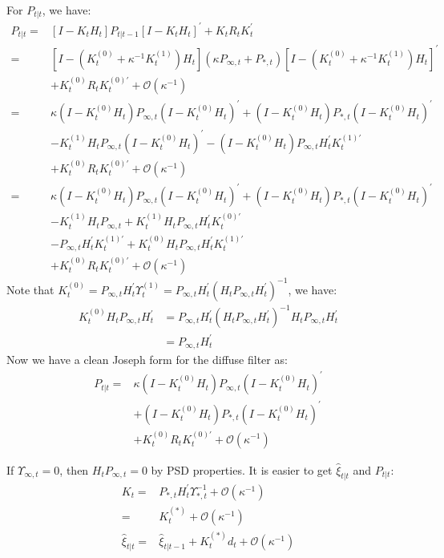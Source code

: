 \documentclass[10pt, titlepage]{article}
\numberwithin{equation}{section}
\begin{document}
For $P_{t|t}$, we have:
\begin{align*}
    P_{t|t} =& [I-K_tH_t]P_{t|t-1}[I-K_tH_t]^{'}+K_tR_tK_t^{'} \\
    =& [I-(K_t^{(0)}+\kappa^{-1}K_t^{(1)})H_t](\kappa P_{\infty,t}+P_{*,t})[I-(K_t^{(0)}+\kappa^{-1}K_t^{(1)})H_t]^{'} \\ 
    &+ K_t^{(0)}R_tK_t^{(0)'} + \mathcal{O}(\kappa^{-1}) \\
    =& \kappa(I-K_t^{(0)}H_t)P_{\infty,t}(I-K_t^{(0)}H_t)^{'} + (I-K_t^{(0)}H_t)P_{*,t}(I-K_t^{(0)}H_t)^{'} \\
    &-K_t^{(1)}H_tP_{\infty,t}(I-K_t^{(0)}H_t)^{'} - (I-K_t^{(0)}H_t)P_{\infty,t}H_t^{'}K_t^{(1)'} \\
    &+ K_t^{(0)}R_tK_t^{(0)'} + \mathcal{O}(\kappa^{-1}) \\
    =& \kappa(I-K_t^{(0)}H_t)P_{\infty,t}(I-K_t^{(0)}H_t)^{'} + (I-K_t^{(0)}H_t)P_{*,t}(I-K_t^{(0)}H_t)^{'} \\
    &-K_t^{(1)}H_tP_{\infty,t} + K_t^{(1)}H_tP_{\infty,t}H_t^{'}K_t^{(0)'} \\
    &- P_{\infty,t}H_t^{'}K_t^{(1)'} + K_t^{(0)}H_tP_{\infty,t}H_t^{'}K_t^{(1)'}  \\
    &+ K_t^{(0)}R_tK_t^{(0)'} + \mathcal{O}(\kappa^{-1}) 
\end{align*}
Note that $K_t^{(0)} = P_{\infty,t}H_t^{'}\Upsilon_t^{(1)} = P_{\infty,t}H_t^{'}(H_tP_{\infty,t}H_t^{'})^{-1}$, we have:
\begin{align*}
    K_t^{(0)}H_tP_{\infty,t}H_t^{'} &= P_{\infty,t}H_t^{'}(H_tP_{\infty,t}H_t^{'})^{-1}H_tP_{\infty,t}H_t^{'} \\
    &= P_{\infty,t}H_t^{'}
\end{align*}
Now we have a clean Joseph form for the diffuse filter as:
\begin{align}
    P_{t|t}=& \kappa (I-K_t^{(0)}H_t)P_{\infty,t}(I-K_t^{(0)}H_t)^{'} \label{eq:diff_P1} \\
    &+(I-K_t^{(0)}H_t)P_{*,t}(I-K_t^{(0)}H_t)^{'} \nonumber \\
    &+K_t^{(0)}R_tK_t^{(0)'} + \mathcal{O}(\kappa^{-1}) \nonumber
\end{align}

If $\Upsilon_{\infty,t}=0$, then $H_tP_{\infty,t}=0$ by PSD properties. It is easier to get $\hat{\xi}_{t|t}$ and $P_{t|t}$:
\begin{align}
    K_t =& P_{*,t}H_t^{'}\Upsilon_{*,t}^{-1} + \mathcal{O}(\kappa^{-1}) \nonumber \\
    =& K_t^{(*)} + \mathcal{O}(\kappa^{-1}) \label{eq:K2_diffuse} \\
    \hat{\xi}_{t|t} =& \hat{\xi}_{t|t-1} + K_t^{(*)}d_t + \mathcal{O}(\kappa^{-1}) \label{eq:diff_xi2} 
\end{align}
\end{document}
